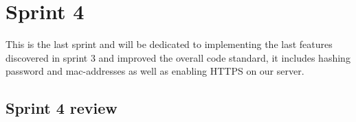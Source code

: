 \chapter{Sprint 4}
This is the last sprint and will be dedicated to implementing the last features discovered in sprint 3 and improved the overall code standard, it includes hashing password and mac-addresses as well as enabling HTTPS on our server. %






\section{Sprint 4 review}